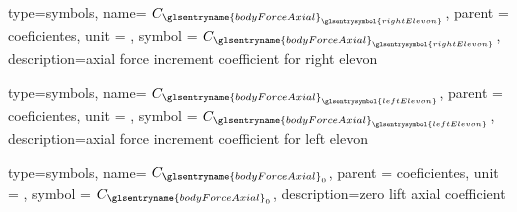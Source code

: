 {type=symbols,
    name= \ensuremath{C_{{\glsentryname{bodyForceAxial}}_{\glsentrysymbol{rightElevon}}}},
    parent = {coeficientes},
    unit = \unexpanded{},
    symbol = \ensuremath{C_{{\glsentryname{bodyForceAxial}}_{\glsentrysymbol{rightElevon}}}},
    description={axial force increment coefficient for right elevon}
}


{type=symbols,
    name= \ensuremath{C_{{\glsentryname{bodyForceAxial}}_{\glsentrysymbol{leftElevon}}}},
    parent = {coeficientes},
    unit = \unexpanded{},
    symbol = \ensuremath{C_{{\glsentryname{bodyForceAxial}}_{\glsentrysymbol{leftElevon}}}},
    description={axial force increment coefficient for left elevon}
}

{type=symbols,
    name= \ensuremath{C_{{\glsentryname{bodyForceAxial}}_{0}}},
    parent = {coeficientes},
    unit = \unexpanded{},
    symbol = \ensuremath{C_{{\glsentryname{bodyForceAxial}}_{0}}},
    description={zero lift axial coefficient}
}